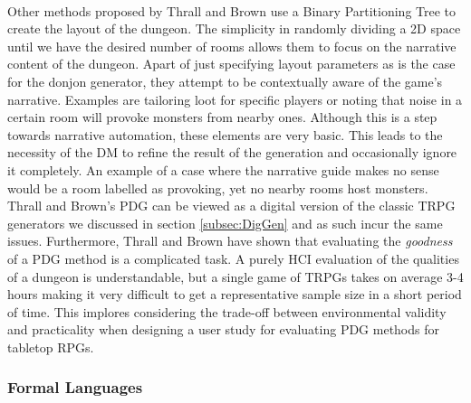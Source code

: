 \documentclass{UoYCSproject}
\begin{document}
\paragraph{}
Other methods proposed by Thrall \parencite{Thrall} and Brown \parencite{Brown} use a Binary Partitioning Tree \parencite{BSP} to create the layout of the dungeon. The simplicity in randomly dividing a 2D space until we have the desired number of rooms allows them to focus on the narrative content of the dungeon. Apart of just specifying layout parameters as is the case for the donjon generator, they attempt to be contextually aware of the game's narrative. Examples are tailoring loot for specific players or noting that noise in a certain room will provoke monsters from nearby ones. Although this is a step towards narrative automation, these elements are very basic. This leads to the necessity of the DM to refine the result of the generation and occasionally ignore it completely. An example of a case where the narrative guide makes no sense would be a room labelled as provoking, yet no nearby rooms host monsters. Thrall and Brown's PDG can be viewed as a digital version of the classic TRPG generators we discussed in section \ref{subsec:DigGen} and as such incur the same issues. Furthermore, Thrall and Brown have shown that evaluating the \textit{goodness} of a PDG method is a complicated task. A purely HCI evaluation of the qualities of a dungeon is understandable, but a single game of TRPGs takes on average 3-4 hours \parencite{gameSessionLengthPoll} making it very difficult to get a representative sample size in a short period of time. This implores considering the trade-off between environmental validity and practicality when designing a user study for evaluating PDG methods for tabletop RPGs.

\subsubsection{Formal Languages}
\label{subsub:FL}
\end{document}
